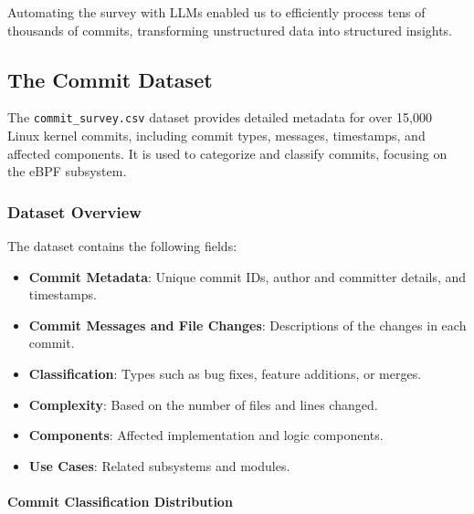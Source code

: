 Automating the survey with LLMs enabled us to efficiently process tens of thousands of commits, transforming unstructured data into structured insights.

\subsection{The Commit Dataset}

The \texttt{commit\_survey.csv} dataset provides detailed metadata for over 15,000 Linux kernel commits, including commit types, messages, timestamps, and affected components. It is used to categorize and classify commits, focusing on the eBPF subsystem.

\subsubsection{Dataset Overview}

The dataset contains the following fields:

\begin{itemize}
    \item \textbf{Commit Metadata}: Unique commit IDs, author and committer details, and timestamps.
    \item \textbf{Commit Messages and File Changes}: Descriptions of the changes in each commit.
    \item \textbf{Classification}: Types such as bug fixes, feature additions, or merges.
    \item \textbf{Complexity}: Based on the number of files and lines changed.
    \item \textbf{Components}: Affected implementation and logic components.
    \item \textbf{Use Cases}: Related subsystems and modules.
\end{itemize}

% 
% 

\paragraph{Commit Classification Distribution}

